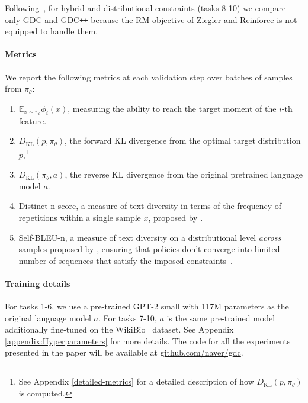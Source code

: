 Following~\citep{khalifa_2021}, for hybrid and distributional constraints (tasks 8-10) we compare only GDC and GDC\texttt{++} because the RM objective of Ziegler and Reinforce is not equipped to handle them. 

\paragraph{Metrics} 
We report the following metrics at each validation step over batches of samples from ${\pi_\theta}$:

\begin{enumerate}
    \itemsep0em \item $\mathbb{E}_{x \sim {\pi_\theta}} \phi_i(x)$, measuring the ability to reach the target moment of the $i$-th feature. 
    \item $D_{\mathrm{KL}}(p, {\pi_\theta})$, the forward KL divergence from the optimal target distribution $p$,\footnote{See Appendix \ref{detailed-metrics} for a detailed description of how $D_{\mathrm{KL}}(p, {\pi_\theta})$ is computed.}

    \item $D_{\mathrm{KL}}({\pi_\theta}, a)$, the reverse KL divergence from the original pretrained language model $a$. 
    \item Distinct-n score, a measure of text diversity in terms of the frequency of repetitions within a single sample $x$, proposed by \citep{li-etal-2016-diversity}. 

    \item Self-BLEU-n, a measure of text diversity on a distributional level \emph{across} samples proposed by \citep{texygen-ZhuLZGZWY18}, ensuring that policies don't converge into limited number of sequences that satisfy the imposed constraints~\cite{GAN_short}.
\end{enumerate}

\paragraph{Training details} For tasks 1-6, we use a pre-trained GPT-2 small with 117M parameters \citep{radford2019language} as the original language model $a$. For tasks 7-10, $a$ is the same pre-trained model additionally fine-tuned on the WikiBio~\citep{DBLP:conf/emnlp/LebretGA16} dataset. See Appendix \ref{appendix:Hyperparameters} for more details. The code for all the experiments presented in the paper will be available at \href{https://github.com/naver/gdc}{github.com/naver/gdc}.


